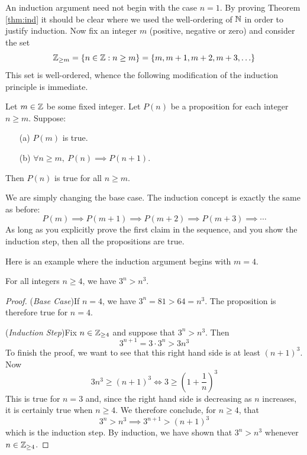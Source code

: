 
An induction argument need not begin with the case $n=1$. By proving Theorem \ref{thm:ind} it should be clear where we used the well-ordering of $\mathbb{N}$ in order to justify induction. Now fix an integer $m$ (positive, negative or zero) and consider the set
\[
	\mathbb{Z}_{\ge m}=\{n\in\mathbb{Z}:n\ge m\}=\{m,m+1,m+2,m+3,\ldots\}
\]
This set is well-ordered, whence the following modification of the induction principle is immediate.

\begin{cor}{}{}
	Let $m\in\mathbb{Z}$ be some fixed integer. Let $P(n)$ be a proposition for each integer $n\ge m$. Suppose:
	\begin{enumerate}
	  \item[(a)] $P(m)$ is true.
	  \item[(b)] $\forall n\ge m,\ P(n)\implies P(n+1)$.
	\end{enumerate}
	Then $P(n)$ is true for all $n\ge m$.
\end{cor}

We are simply changing the base case. The induction concept is exactly the same as before:
\[
	P(m)\implies P(m+1)\implies P(m+2)\implies P(m+3)\implies\cdots
\]
As long as you explicitly prove the first claim in the sequence, and you show the induction step, then all the propositions are true.\par


Here is an example where the induction argument begins with $m=4$.

\begin{thm}{}{}
	For all integers $n\ge 4$, we have $3^n>n^3$.
\end{thm}

\begin{proof}
	(\emph{Base Case})\quad If $n=4$, we have $3^n=81>64=n^3$. The proposition is therefore true for $n=4$.\par
	(\emph{Induction Step})\quad Fix $n\in\mathbb{Z}_{\ge 4}$ and suppose that $3^n>n^3$. Then
	\[
		3^{n+1}=3\cdot 3^n>3n^3
	\]
	To finish the proof, we want to see that this right hand side is at least $(n+1)^3$. Now
	\[
		3n^3\ge(n+1)^3\iff 3\ge\left(1+\frac 1n\right)^3
	\]
	This is true for $n=3$ and, since the right hand side is decreasing as $n$ increases, it is certainly true  when $n\ge 4$. We therefore conclude, for $n\ge 4$, that
	\[
		3^n>n^3\implies 3^{n+1}>(n+1)^3
	\]
	which is the induction step. By induction, we have shown that $3^n>n^3$ whenever $n\in\mathbb{Z}_{\ge 4}$.
\end{proof}


